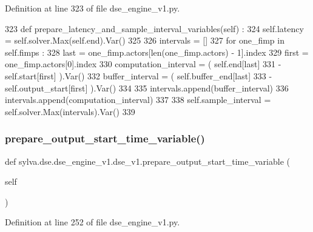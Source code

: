 Definition at line 323 of file dse\+\_\+engine\+\_\+v1.\+py.


\begin{DoxyCode}
323   \textcolor{keyword}{def }prepare\_latency\_and\_sample\_interval\_variables(self) :
324     self.latency = self.solver.Max(self.end).Var()
325 
326     intervals = []
327     \textcolor{keywordflow}{for} one\_fimp \textcolor{keywordflow}{in} self.fimps :
328       last = one\_fimp.actors[len(one\_fimp.actors) - 1].index
329       first = one\_fimp.actors[0].index
330       computation\_interval = ( self.end[last]
331                              - self.start[first] ).Var()
332       buffer\_interval = ( self.buffer\_end[last]
333                         - self.output\_start[first] ).Var()
334 
335       intervals.append(buffer\_interval)
336       intervals.append(computation\_interval)
337 
338     self.sample\_interval = self.solver.Max(intervals).Var()
339 
\end{DoxyCode}
\mbox{\label{classsylva_1_1dse_1_1dse__engine__v1_1_1dse__v1_a225a04af42165cc16fa445a81cc818a5}} 
\subsubsection{\texorpdfstring{prepare\+\_\+output\+\_\+start\+\_\+time\+\_\+variable()}{prepare\_output\_start\_time\_variable()}}
{\footnotesize\ttfamily def sylva.\+dse.\+dse\+\_\+engine\+\_\+v1.\+dse\+\_\+v1.\+prepare\+\_\+output\+\_\+start\+\_\+time\+\_\+variable (\begin{DoxyParamCaption}\item[{}]{self }\end{DoxyParamCaption})}



Definition at line 252 of file dse\+\_\+engine\+\_\+v1.\+py.


